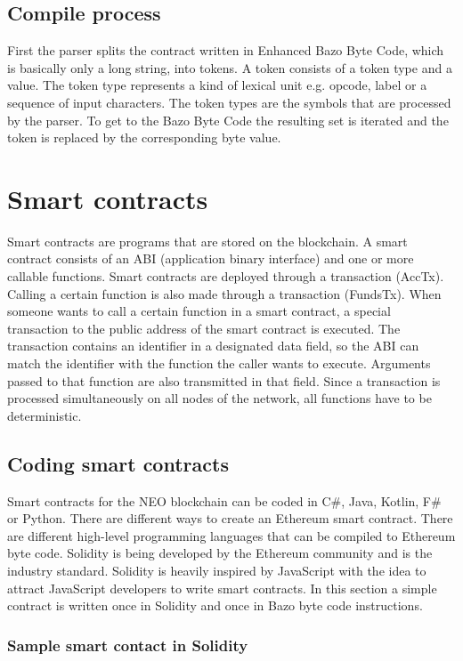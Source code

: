 \subsection{Compile process}
First the parser splits the contract written in \flqq Enhanced Bazo Byte Code\frqq{}, which is basically only a long string, into tokens. A token consists of a token type and a value. The token type represents a kind of lexical unit e.g. opcode, label or a sequence of input characters. The token types are the symbols that are processed by the parser. \cite{aho_compilers:_2007} To get to the \flqq Bazo Byte Code\frqq{} the resulting set is iterated and the token is replaced by the corresponding byte value.

\section{Smart contracts}
Smart contracts are programs that are stored on the blockchain. A smart contract consists of an ABI (application binary interface) and one or more callable functions. Smart contracts are deployed through a transaction (AccTx). Calling a certain function is also made through a transaction (FundsTx). When someone wants to call a certain function in a smart contract, a special transaction to the public address of the smart contract is executed. The transaction contains an identifier in a designated data field, so the ABI can match the identifier with the function the caller wants to execute. Arguments passed to that function are also transmitted in that field. Since a transaction is processed simultaneously on all nodes of the network, all functions have to be deterministic.

\subsection{Coding smart contracts}
Smart contracts for the NEO blockchain can be coded in C\#, Java, Kotlin, F\# or Python. There are different ways to create an Ethereum smart contract. There are different high-level programming languages that can be compiled to Ethereum byte code. Solidity is being developed by the Ethereum community and is the industry standard. Solidity is heavily inspired by JavaScript with the idea to attract JavaScript developers to write smart contracts. In this section a simple contract is written once in Solidity and once in Bazo byte code instructions.

\subsubsection{Sample smart contact in Solidity}
	
